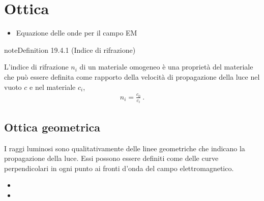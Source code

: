 \documentclass[letterpaper,10pt,italian]{jupyterBook}
\begin{document}
\section{Ottica}
\label{\detokenize{ch/waves/intro:ottica}}\label{\detokenize{ch/waves/intro:physics-hs-waves-optics}}
\sphinxAtStartPar
{}
\begin{itemize}
\item {} 
\sphinxAtStartPar
Equazione delle onde per il campo EM

\end{itemize}
\label{ch/waves/intro:refraction-index}
\begin{sphinxadmonition}{note}{Definition 19.4.1 (Indice di rifrazione)}



\sphinxAtStartPar
L’indice di rifrazione \(n_i\) di un materiale omogeneo è una proprietà del materiale che può essere definita come rapporto della velocità di propagazione della luce nel vuoto \(c\) e nel materiale \(c_i\),
\begin{equation*}
\begin{split}n_i = \frac{c_0}{c_i} \ .\end{split}
\end{equation*}\end{sphinxadmonition}


\subsection{Ottica geometrica}
\label{\detokenize{ch/waves/intro:ottica-geometrica}}\label{\detokenize{ch/waves/intro:physics-hs-waves-optics-geometric}}
\sphinxAtStartPar
{} I raggi luminosi sono qualitativamente delle linee geometriche che indicano la propagazione della luce. Essi possono essere definiti come delle curve perpendicolari in ogni punto ai fronti d’onda del campo elettromagnetico.

\sphinxAtStartPar
{}
\begin{itemize}
\item {} 
\sphinxAtStartPar
{}

\item {} 
\sphinxAtStartPar
{}

\end{itemize}
\end{document}
